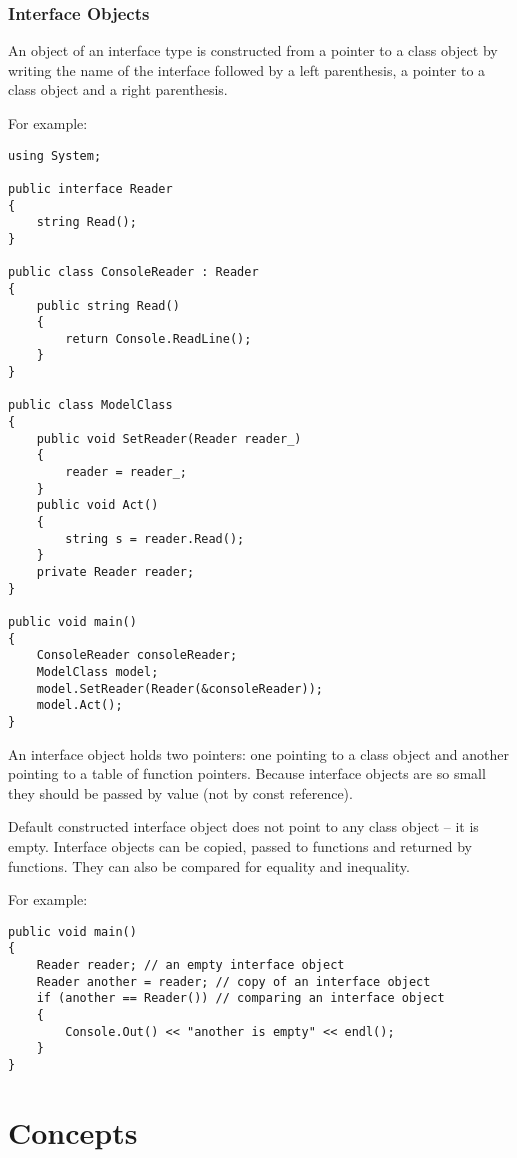 \documentclass[a4paper,oneside,11pt]{article}
\begin{document}
\subsubsection{Interface Objects}

An object of an interface type is constructed from a pointer to a class object by writing the name of the interface followed by
a left parenthesis, a pointer to a class object and a right parenthesis.

\begin{flushleft}
For example:
\end{flushleft}

\begin{lstlisting}[frame=trBL]
using System;

public interface Reader
{
    string Read();
}

public class ConsoleReader : Reader
{
    public string Read()
    {
        return Console.ReadLine();
    }
}

public class ModelClass
{
    public void SetReader(Reader reader_)
    {
        reader = reader_;
    }
    public void Act()
    {
        string s = reader.Read();
    }
    private Reader reader;
}

public void main()
{
    ConsoleReader consoleReader;
    ModelClass model;
    model.SetReader(Reader(&consoleReader));
    model.Act();
}
\end{lstlisting}

An interface object holds two pointers: one pointing to a class object and another pointing to a table of function pointers.
Because interface objects are so small they should be passed by value (not by const reference).

Default constructed interface object does not point to any class object -- it is empty.
Interface objects can be copied, passed to functions and returned by functions.
They can also be compared for equality and inequality.

For example:

\begin{lstlisting}[frame=trBL]
public void main()
{
    Reader reader; // an empty interface object
    Reader another = reader; // copy of an interface object
    if (another == Reader()) // comparing an interface object
    {
        Console.Out() << "another is empty" << endl();
    }
}
\end{lstlisting}

\section{Concepts}\label{conceptdefinition}\label{conceptname}
\end{document}
